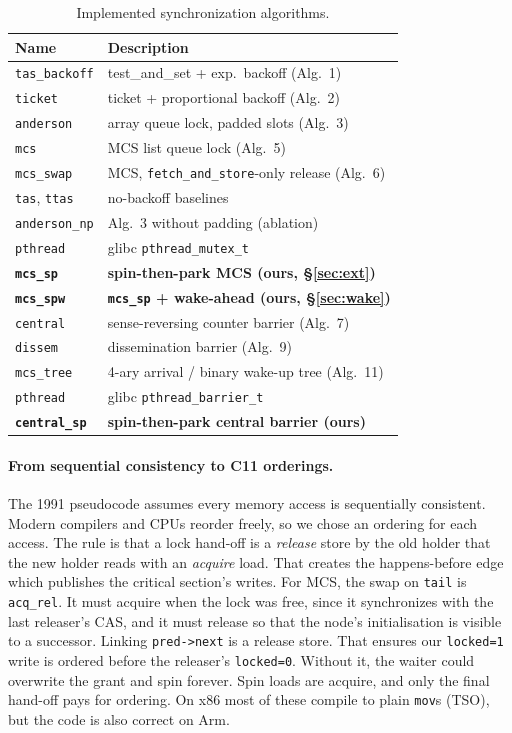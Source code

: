 \documentclass[10pt,twocolumn]{article}
\begin{document}
\begin{table}[t]
\centering\small
\caption{Implemented synchronization algorithms.}
\label{tab:locks}
\begin{tabular}{@{}ll@{}}
\toprule
Name & Description \\
\midrule
\texttt{tas\_backoff} & test\_and\_set + exp.\ backoff (Alg.~1)\\
\texttt{ticket} & ticket + proportional backoff (Alg.~2)\\
\texttt{anderson} & array queue lock, padded slots (Alg.~3)\\
\texttt{mcs} & MCS list queue lock (Alg.~5)\\
\texttt{mcs\_swap} & MCS, \texttt{fetch\_and\_store}-only release (Alg.~6)\\
\texttt{tas}, \texttt{ttas} & no-backoff baselines\\
\texttt{anderson\_np} & Alg.~3 without padding (ablation)\\
\texttt{pthread} & glibc \texttt{pthread\_mutex\_t}\\
\textbf{\texttt{mcs\_sp}} & \textbf{spin-then-park MCS (ours, \S\ref{sec:ext})}\\
\textbf{\texttt{mcs\_spw}} & \textbf{\texttt{mcs\_sp} + wake-ahead (ours, \S\ref{sec:wake})}\\
\midrule
\texttt{central} & sense-reversing counter barrier (Alg.~7)\\
\texttt{dissem} & dissemination barrier (Alg.~9)\\
\texttt{mcs\_tree} & 4-ary arrival / binary wake-up tree (Alg.~11)\\
\texttt{pthread} & glibc \texttt{pthread\_barrier\_t}\\
\textbf{\texttt{central\_sp}} & \textbf{spin-then-park central barrier (ours)}\\
\bottomrule
\end{tabular}
\end{table}

\paragraph{From sequential consistency to C11 orderings.} The 1991 pseudocode assumes every memory
access is sequentially consistent. Modern compilers and CPUs reorder freely, so we chose an ordering for
each access. The rule is that a lock hand-off is a \emph{release} store by the old holder that the new
holder reads with an \emph{acquire} load. That creates the happens-before edge which publishes the
critical section's writes. For MCS, the swap on \texttt{tail} is \texttt{acq\_rel}. It must acquire when the lock was
free, since it synchronizes with the last releaser's CAS, and it must release so that the node's
initialisation is visible to a successor. Linking \texttt{pred->next} is a release store. That ensures
our \texttt{locked=1} write is ordered before the releaser's \texttt{locked=0}. Without it, the waiter
could overwrite the grant and spin forever. Spin loads are acquire, and only the final hand-off pays for
ordering. On x86 most of these compile to plain \texttt{mov}s (TSO), but the code is also correct on
Arm.
\end{document}
